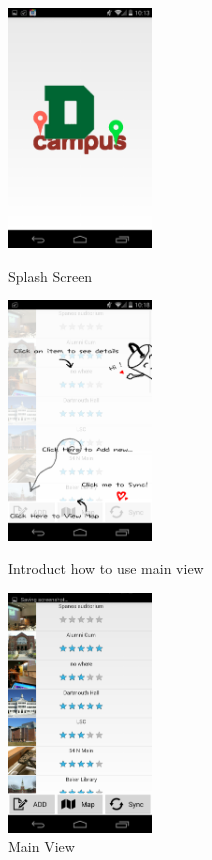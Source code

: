 \documentclass{article}
\begin{document}
\begin{figure}[h!]
\begin{minipage}[h!]{0.3\linewidth}
\centering
\includegraphics[width=1.5in]{figures/splash_screen.png}
\caption{Splash Screen}
\label{F:splash}
\end{minipage}%
\begin{minipage}[h!]{0.4\linewidth}
\centering
\includegraphics[width=1.5in]{figures/main_view_intro.png}
\caption{Introduct how to use main view}
\label{F:main_view_intro}
\end{minipage}
\begin{minipage}[h!]{0.3\linewidth}
\centering
\includegraphics[width=1.5in]{figures/main_view.png}
\caption{Main View}
\label{F:main_view}
\end{minipage}%
\end{figure}
\end{document}
